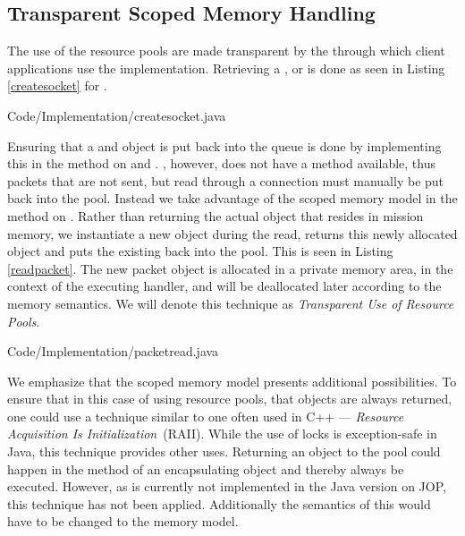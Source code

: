 \subsection{Transparent Scoped Memory Handling} %
\label{sub:transparent_memory_}
The use of the resource pools are made transparent by the  through which client applications use the implementation. Retrieving a ,  or  is done as seen in Listing \ref{createsocket} for .

{Code/Implementation/createsocket.java}

Ensuring that a  and  object is put back into the queue is done by implementing this in the  method on  and . , however, does not have a  method available, thus packets that are not sent, but read through a connection must manually be put back into the pool. Instead we take advantage of the scoped memory model in the  method on . Rather than returning the actual  object that resides in mission memory, we instantiate a new object during the read, returns this newly allocated  object and puts the existing back into the pool. This is seen in Listing \ref{readpacket}. The new packet object is allocated in a private memory area, in the context of the executing handler, and will be deallocated later according to the memory semantics. We will denote this technique as \textit{Transparent Use of Resource Pools}.

{Code/Implementation/packetread.java}


We emphasize that the scoped memory model presents additional possibilities. To ensure that in this case of using resource pools, that objects are always returned, one could use a technique similar to one often used in C++ --- \textit{Resource Acquisition Is Initialization}~(RAII)\cite{RAII}. While the use of locks is exception-safe in Java, this technique provides other uses. Returning an object to the pool could happen in the  method of an encapsulating object and thereby always be executed. However, as  is currently not implemented in the Java version on JOP, this technique has not been applied. Additionally the semantics of this would have to be changed to the memory model.